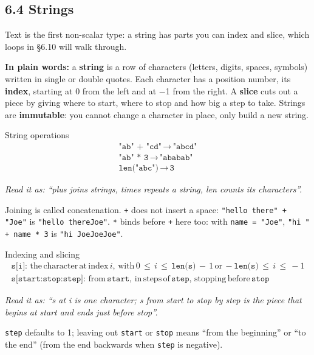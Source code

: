 \documentclass[11pt]{article}
\begin{document}
\begin{keepsection}
\section{6.4 Strings}

Text is the first non-scalar type: a string has parts you can index and slice, which loops in §6.10 will walk through.

\begin{plainbox}\textbf{In plain words:} a \textbf{string} is a row of characters (letters, digits, spaces, symbols) written in single or double quotes. Each character has a position number, its \textbf{index}, starting at 0 from the left and at \ensuremath{-}1 from the right. A \textbf{slice} cuts out a piece by giving where to start, where to stop and how big a step to take. Strings are \textbf{immutable}: you cannot change a character in place, only build a new string.\end{plainbox}

\begin{equationcard}{String operations}
\[ \begin{gathered} \texttt{"ab" + "cd"}\, \to \, \texttt{"abcd"} \\ \texttt{"ab" * 3}\, \to \, \texttt{"ababab"} \\ \texttt{len("abc")}\, \to \, \texttt{3} \end{gathered} \]
{\small \emph{Read it as: “plus joins strings, times repeats a string, len counts its characters”.}\par  Joining is called concatenation. \texttt{+} does not insert a space: \texttt{"hello there" + "Joe"} is \texttt{"hello thereJoe"}. \texttt{*} binds before \texttt{+} here too: with \texttt{name = "Joe"}, \texttt{"hi " + name * 3} is \texttt{"hi JoeJoeJoe"}.}
\end{equationcard}

\begin{equationcard}{Indexing and slicing}
\[ \begin{gathered} \texttt{s[i]}:\, \text{the}\, \text{character}\, \text{at}\, \text{index}\, {i},\, \text{with}\, 0\, \leq \, {i}\, \leq \, \texttt{len(s)}\, -\, 1\, \text{or}\, -\texttt{len(s)}\, \leq \, {i}\, \leq \, -1 \\ \texttt{s[start:stop:step]}:\, \text{from}\, \texttt{start},\, \text{in}\, \text{steps}\, \text{of}\, \texttt{step},\, \text{stopping}\, \text{before}\, \texttt{stop} \end{gathered} \]
{\small \emph{Read it as: “s at i is one character; s from start to stop by step is the piece that begins at start and ends just before stop”.}\par  \texttt{step} defaults to 1; leaving out \texttt{start} or \texttt{stop} means “from the beginning” or “to the end” (from the end backwards when \texttt{step} is negative).}
\end{equationcard}


\end{keepsection}
\end{document}
